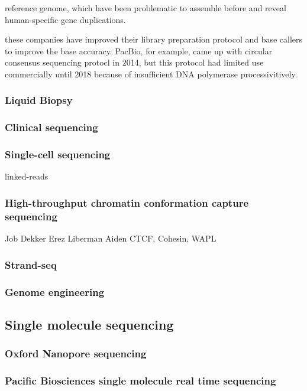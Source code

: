 reference genome, which have been problematic to assemble before and reveal human-specific gene duplications.   

these companies have improved their library preparation protocol and base callers to improve the base accuracy. PacBio, for example, came up with circular consensus sequencing protocl in 2014, but this protocol had limited use commercially until 2018 because of insufficient DNA polymerase processivitively.   

\subsubsection{Liquid Biopsy}

\subsubsection{Clinical sequencing}

\subsubsection{Single-cell sequencing}

linked-reads

\subsubsection{High-throughput chromatin conformation capture sequencing}

Job Dekker
Erez Liberman Aiden
CTCF, Cohesin, WAPL

\subsubsection{Strand-seq}

\subsubsection{Genome engineering}

\subsection{Single molecule sequencing}

\subsubsection{Oxford Nanopore sequencing}

\subsubsection{Pacific Biosciences single molecule real time sequencing}



